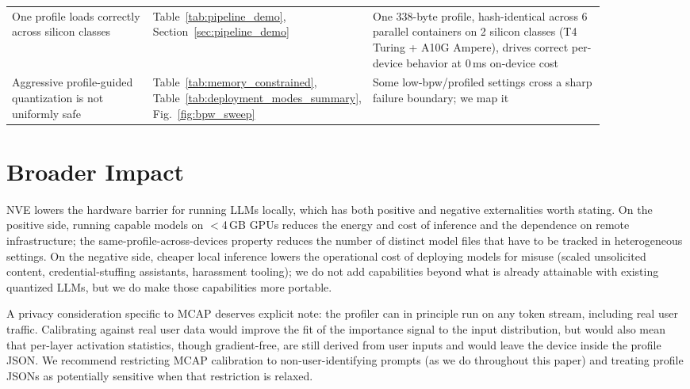 \documentclass{article}
\begin{document}
\begin{table}[H]
\begin{tabular}{p{0.25\linewidth}p{0.2\linewidth}p{0.42\linewidth}}
One profile loads correctly across silicon classes & Table~\ref{tab:pipeline_demo}, Section~\ref{sec:pipeline_demo} & One 338-byte profile, hash-identical across 6 parallel containers on 2 silicon classes (T4 Turing + A10G Ampere), drives correct per-device behavior at 0\,ms on-device cost \\
Aggressive profile-guided quantization is not uniformly safe & Table~\ref{tab:memory_constrained}, Table~\ref{tab:deployment_modes_summary}, Fig.~\ref{fig:bpw_sweep} & Some low-bpw/profiled settings cross a sharp failure boundary; we map it \\
\bottomrule
\end{tabular}
\end{table}


\section{Broader Impact}
\label{sec:broader_impact}

NVE lowers the hardware barrier for running LLMs locally, which has both
positive and negative externalities worth stating. On the positive side, running
capable models on $<$4\,GB GPUs reduces the energy and cost of inference and
the dependence on remote infrastructure; the same-profile-across-devices
property reduces the number of distinct model files that have to be tracked in
heterogeneous settings. On the negative side, cheaper local inference lowers
the operational cost of deploying models for misuse (scaled unsolicited
content, credential-stuffing assistants, harassment tooling); we do not add
capabilities beyond what is already attainable with existing quantized LLMs,
but we do make those capabilities more portable.

A privacy consideration specific to MCAP deserves explicit note: the profiler
can in principle run on any token stream, including real user traffic.
Calibrating against real user data would improve the fit of the importance
signal to the input distribution, but would also mean that per-layer activation
statistics, though gradient-free, are still derived from user inputs and would
leave the device inside the profile JSON. We recommend restricting MCAP
calibration to non-user-identifying prompts (as we do throughout this paper)
and treating profile JSONs as potentially sensitive when that restriction is
relaxed.

\end{document}
